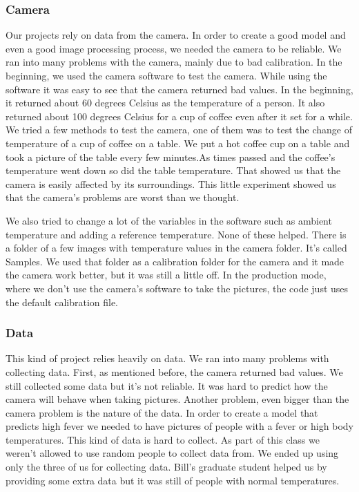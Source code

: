\subsubsection*{Camera}
	Our projects rely on data from the camera. In order to create a good model and even a good image processing process, we needed the camera to be reliable. We ran into many problems with the camera, mainly due to bad calibration. In the beginning, we used the camera software to test the camera. While using the software it was easy to see that the camera returned bad values. In the beginning, it returned about 60 degrees Celsius as the temperature of a person. It also returned about 100 degrees Celsius for a cup of coffee even after it set for a while. We tried a few methods to test the camera, one of them was to test the change of temperature of a cup of coffee on a table. We put a hot coffee cup on a table and took a picture of the table every few minutes.As times passed and the coffee’s temperature went down so did the table temperature. That showed us that the camera is easily affected by its surroundings. This little experiment showed us that the camera's problems are worst than we thought. 
	
	We also tried to change a lot of the variables in the software such as ambient temperature and adding a reference temperature. None of these helped.  There is a folder of a few images with temperature values in the camera folder. It’s called Samples. We used that folder as a calibration folder for the camera and it made the camera work better, but it was still a little off. In the production mode, where we don’t use the camera’s software to take the pictures, the code just uses the default calibration file. 
	
	
	
\subsubsection*{Data}
	This kind of project relies heavily on data. We ran into many problems with collecting data. First, as mentioned before, the camera returned bad values. We still collected some data but it’s not reliable. It was hard to predict how the camera will behave when taking pictures.  Another problem, even bigger than the camera problem is the nature of the data. In order to create a model that predicts high fever we needed to have pictures of people with a fever or high body temperatures. This kind of data is hard to collect. As part of this class we weren't allowed to use random people to collect data from. We ended up using only the three of us for collecting data. Bill’s graduate student helped us by providing some extra data but it was still of people with normal temperatures. 
	


